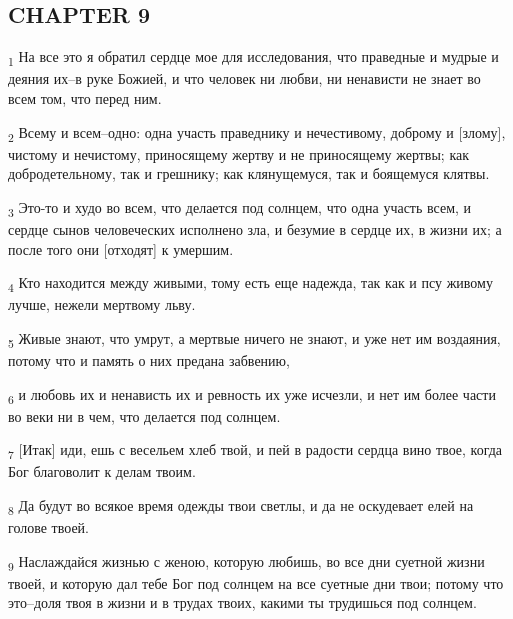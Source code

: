 \subsection{CHAPTER 9}
\begin{tcolorbox}
\textsubscript{1} На все это я обратил сердце мое для исследования, что праведные и мудрые и деяния их--в руке Божией, и что человек ни любви, ни ненависти не знает во всем том, что перед ним.
\end{tcolorbox}
\begin{tcolorbox}
\textsubscript{2} Всему и всем--одно: одна участь праведнику и нечестивому, доброму и [злому], чистому и нечистому, приносящему жертву и не приносящему жертвы; как добродетельному, так и грешнику; как клянущемуся, так и боящемуся клятвы.
\end{tcolorbox}
\begin{tcolorbox}
\textsubscript{3} Это-то и худо во всем, что делается под солнцем, что одна участь всем, и сердце сынов человеческих исполнено зла, и безумие в сердце их, в жизни их; а после того они [отходят] к умершим.
\end{tcolorbox}
\begin{tcolorbox}
\textsubscript{4} Кто находится между живыми, тому есть еще надежда, так как и псу живому лучше, нежели мертвому льву.
\end{tcolorbox}
\begin{tcolorbox}
\textsubscript{5} Живые знают, что умрут, а мертвые ничего не знают, и уже нет им воздаяния, потому что и память о них предана забвению,
\end{tcolorbox}
\begin{tcolorbox}
\textsubscript{6} и любовь их и ненависть их и ревность их уже исчезли, и нет им более части во веки ни в чем, что делается под солнцем.
\end{tcolorbox}
\begin{tcolorbox}
\textsubscript{7} [Итак] иди, ешь с весельем хлеб твой, и пей в радости сердца вино твое, когда Бог благоволит к делам твоим.
\end{tcolorbox}
\begin{tcolorbox}
\textsubscript{8} Да будут во всякое время одежды твои светлы, и да не оскудевает елей на голове твоей.
\end{tcolorbox}
\begin{tcolorbox}
\textsubscript{9} Наслаждайся жизнью с женою, которую любишь, во все дни суетной жизни твоей, и которую дал тебе Бог под солнцем на все суетные дни твои; потому что это--доля твоя в жизни и в трудах твоих, какими ты трудишься под солнцем.
\end{tcolorbox}
